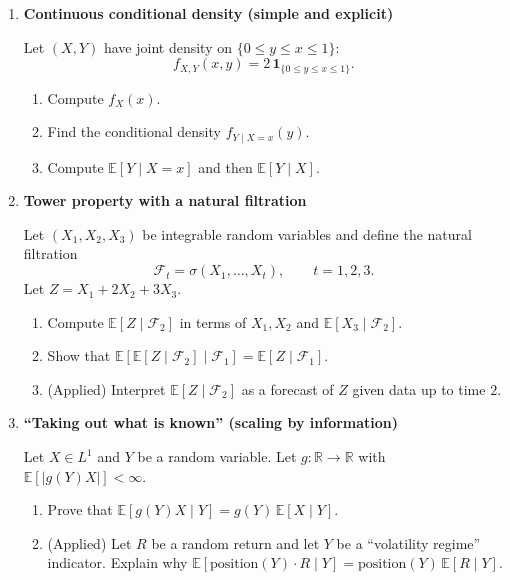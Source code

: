 \documentclass[11pt]{article}
\begin{document}
\begin{enumerate}
\bigskip

\item \textbf{Continuous conditional density (simple and explicit)}

Let $(X,Y)$ have joint density on $\{0\le y\le x\le 1\}$:
\[
f_{X,Y}(x,y)=2\,\mathbf{1}_{\{0\le y\le x\le 1\}}.
\]
\begin{enumerate}
\item Compute $f_X(x)$.
\item Find the conditional density $f_{Y\mid X=x}(y)$.
\item Compute $\mathbb{E}[Y\mid X=x]$ and then $\mathbb{E}[Y\mid X]$.
\end{enumerate}

\bigskip

\item \textbf{Tower property with a natural filtration}

Let $(X_1,X_2,X_3)$ be integrable random variables and define the natural filtration
\[
\mathcal{F}_t=\sigma(X_1,\dots,X_t),\qquad t=1,2,3.
\]
Let $Z=X_1+2X_2+3X_3$.
\begin{enumerate}
\item Compute $\mathbb{E}[Z\mid \mathcal{F}_2]$ in terms of $X_1,X_2$ and $\mathbb{E}[X_3\mid \mathcal{F}_2]$.
\item Show that $\mathbb{E}[\mathbb{E}[Z\mid \mathcal{F}_2]\mid \mathcal{F}_1]=\mathbb{E}[Z\mid \mathcal{F}_1]$.
\item (Applied) Interpret $\mathbb{E}[Z\mid \mathcal{F}_2]$ as a forecast of $Z$ given data up to time $2$.
\end{enumerate}

\bigskip

\item \textbf{``Taking out what is known'' (scaling by information)}

Let $X\in L^1$ and $Y$ be a random variable. Let $g:\mathbb{R}\to\mathbb{R}$ with $\mathbb{E}[|g(Y)X|]<\infty$.
\begin{enumerate}
\item Prove that $\mathbb{E}[g(Y)X\mid Y]=g(Y)\,\mathbb{E}[X\mid Y]$.
\item (Applied) Let $R$ be a random return and let $Y$ be a ``volatility regime'' indicator. Explain why
$\mathbb{E}[\text{position}(Y)\cdot R\mid Y]=\text{position}(Y)\,\mathbb{E}[R\mid Y]$.
\end{enumerate}


\end{enumerate}
\end{document}
